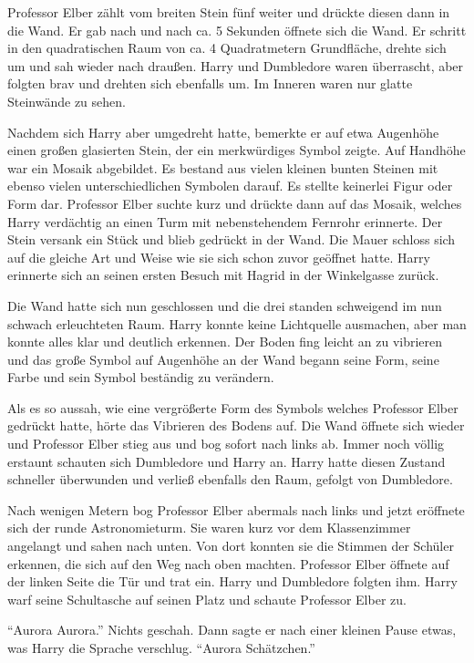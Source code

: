 Professor Elber zählt vom breiten Stein fünf weiter und drückte diesen dann in die Wand. Er gab nach und nach ca. 5 Sekunden öffnete sich die Wand. Er schritt in den quadratischen Raum von ca. 4 Quadratmetern Grundfläche, drehte sich um und sah wieder nach draußen. Harry und Dumbledore waren überrascht, aber folgten brav und drehten sich ebenfalls um. Im Inneren waren nur glatte Steinwände zu sehen.

Nachdem sich Harry aber umgedreht hatte, bemerkte er auf etwa Augenhöhe einen großen glasierten Stein, der ein merkwürdiges Symbol zeigte. Auf Handhöhe war ein Mosaik abgebildet. Es bestand aus vielen kleinen bunten Steinen mit ebenso vielen unterschiedlichen Symbolen darauf. Es stellte keinerlei Figur oder Form dar. Professor Elber suchte kurz und drückte dann auf das Mosaik, welches Harry verdächtig an einen Turm mit nebenstehendem Fernrohr erinnerte. Der Stein versank ein Stück und blieb gedrückt in der Wand. Die Mauer schloss sich auf die gleiche Art und Weise wie sie sich schon zuvor geöffnet hatte. Harry erinnerte sich an seinen ersten Besuch mit Hagrid in der Winkelgasse zurück.

Die Wand hatte sich nun geschlossen und die drei standen schweigend im nun schwach erleuchteten Raum. Harry konnte keine Lichtquelle ausmachen, aber man konnte alles klar und deutlich erkennen. Der Boden fing leicht an zu vibrieren und das große Symbol auf Augenhöhe an der Wand begann seine Form, seine Farbe und sein Symbol beständig zu verändern.

Als es so aussah, wie eine vergrößerte Form des Symbols welches Professor Elber gedrückt hatte, hörte das Vibrieren des Bodens auf. Die Wand öffnete sich wieder und Professor Elber stieg aus und bog sofort nach links ab. Immer noch völlig erstaunt schauten sich Dumbledore und Harry an. Harry hatte diesen Zustand schneller überwunden und verließ ebenfalls den Raum, gefolgt von Dumbledore.

Nach wenigen Metern bog Professor Elber abermals nach links und jetzt eröffnete sich der runde Astronomieturm. Sie waren kurz vor dem Klassenzimmer angelangt und sahen nach unten. Von dort konnten sie die Stimmen der Schüler erkennen, die sich auf den Weg nach oben machten. Professor Elber öffnete auf der linken Seite die Tür und trat ein. Harry und Dumbledore folgten ihm. Harry warf seine Schultasche auf seinen Platz und schaute Professor Elber zu.

\enquote{Aurora \gst Aurora.} Nichts geschah. Dann sagte er nach einer kleinen Pause etwas, was Harry die Sprache verschlug. \enquote{Aurora Schätzchen.}

